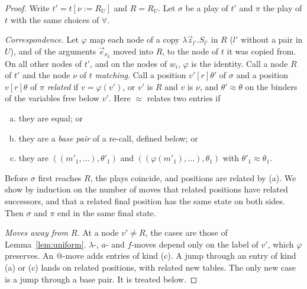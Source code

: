 \documentclass[11pt]{article}
\theoremstyle{plain}
\theoremstyle{definition}
\theoremstyle{remark}
\begin{document}
\begin{proof}
Write $t'=t[\nu:=R_U]$ and $R=R_U$.  Let $\sigma$ be a play of $t'$ and
$\pi$ the play of $t$ with the same choices of $\forall$.

\emph{Correspondence.}  Let $\varphi$ map each node of a copy
$\lambda\vec z_{l'}.S_{l'}$ in $R$ ($l'$ without a pair in $U$), and of
the arguments $\vec e_{\nu_k}$ moved into $R$, to the node of $t$ it was
copied from.  On all other nodes of $t'$, and on the nodes of $w_i$,
$\varphi$ is the identity.  Call a node $R$ of $t'$ and the node $\nu$ of
$t$ \emph{matching}.  Call a position $v'[r]\theta'$ of $\sigma$ and a
position $v[r]\theta$ of $\pi$ \emph{related} if $v=\varphi(v')$, or
$v'$ is $R$ and $v$ is $\nu$, and $\theta'\approx\theta$ on the binders of
the variables free below $v'$.  Here $\approx$ relates two entries if
\begin{enumerate}[(a)]
\item they are equal; or
\item they are a \emph{base pair} of a re-call, defined below; or
\item they are $((m'_1,\dots),\theta'_1)$ and
  $((\varphi(m'_1),\dots),\theta_1)$ with $\theta'_1\approx\theta_1$.
\end{enumerate}
Before $\sigma$ first reaches $R$, the plays coincide, and positions are
related by (a).  We show by induction on the number of moves that
related positions have related successors, and that a related final
position has the same state on both sides.  Then $\sigma$ and $\pi$ end
in the same final state.

\emph{Moves away from $R$.}  At a node $v'\neq R$, the cases are those of
Lemma~\ref{lem:uniform}.  $\lambda$-, $a$- and $f$-moves depend only on
the label of $v'$, which $\varphi$ preserves.  An $@$-move adds entries
of kind (c).  A jump through an entry of kind (a) or (c) lands on
related positions, with related new tables.  The only new case is a
jump through a base pair.  It is treated below.


\end{proof}
\end{document}
